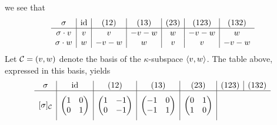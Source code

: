 \begin{xmpl}
                we see that
                \begin{align*}
                    \begin{array}{c|c|c|c|c|c|c}
                        \sigma&\id&(12)&(13)&(23)&(123)&(132)\\\hline
                        \sigma\cdot v&v&v&-v-w&w&-v-w&w\\%
                        \sigma\cdot w&w&-v-w&w&v&v&-v-w
                    \end{array}
                \end{align*}
                Let $\mathcal C=(v,w)$ denote the basis of the $\kappa$-subspace $\langle v,w\rangle$. The table above, expressed in this basis, yields
                \begin{align*}
                    \begin{array}{c|c|c|c|c|c|c}
                        \sigma&\operatorname{id}&(12)&(13)&(23)&(123)&(132)\\\hline
                        \begin{matrix}
                            \\{[\sigma]_{\mathcal C}}\\\\
                        \end{matrix}
                        &\begin{pmatrix}
                            1&0\\
                            0&1
                        \end{pmatrix}
                        &\begin{pmatrix}
                            1&-1\\
                            0&-1
                        \end{pmatrix}
                        &\begin{pmatrix}
                            -1&0\\
                            -1&1
                        \end{pmatrix}
                        &\begin{pmatrix}
                            0&1\\
                            1&0
                        \end{pmatrix}

\end{array}
\end{align*}
\end{xmpl}
